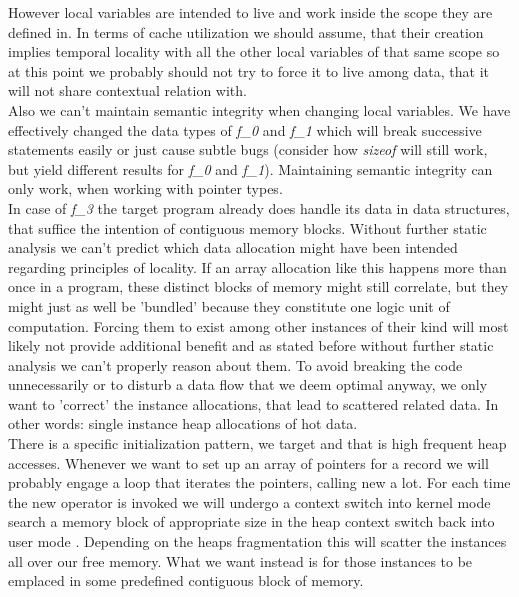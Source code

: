 However local variables are intended to live and work inside the scope they are defined in. In terms of cache utilization we should assume, that their creation implies temporal locality with all the other local variables of that same scope so at this point we probably should not try to force it to live among data, that it will not share contextual relation with.\\
Also we can't maintain semantic integrity when changing local variables. We have effectively changed the data types of \textit{f\_0} and \textit{f\_1} which will break successive statements easily or just cause subtle bugs (consider how \textit{sizeof} will still work, but yield different results for \textit{f\_0} and \textit{f\_1}). Maintaining semantic integrity can only work, when working with pointer types.\\
In case of \textit{f\_3} the target program already does handle its data in data structures, that suffice the intention of contiguous memory blocks. Without further static analysis we can't predict which data allocation might have been intended regarding principles of locality. If an array allocation like this happens more than once in a program, these distinct blocks of memory might still correlate, but they might just as well be 'bundled' because they constitute one logic unit of computation. Forcing them to exist among other instances of their kind will most likely not provide additional benefit and as stated before without further static analysis we can't properly reason about them. To avoid breaking the code unnecessarily or to disturb a data flow that we deem optimal anyway, we only want to 'correct' the instance allocations, that lead to scattered related data. In other words: single instance heap allocations of hot data.\\
There is a specific initialization pattern, we target and that is high frequent heap accesses. Whenever we want to set up an array of pointers for a record we will probably engage a loop that iterates the pointers, calling new a lot. For each time the new operator is invoked we will undergo a context switch into kernel mode search a memory block of appropriate size in the heap context switch back into user mode . Depending on the heaps fragmentation this will scatter the instances all over our free memory. What we want instead is for those instances to be emplaced in some predefined contiguous block of memory.

